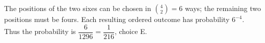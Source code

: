 The positions of the two sixes can be chosen in $\binom42=6$ ways; the remaining two positions must be fours. Each resulting ordered outcome has probability $6^{-4}$. Thus the probability is $\dfrac{6}{1296}=\boxed{\dfrac{1}{216}}$, choice E.
